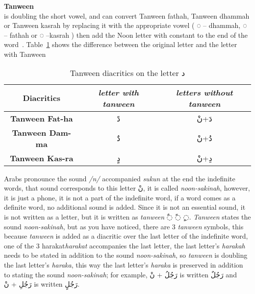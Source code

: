 \begin{definition}\label{def:tanween_definition}
  \textbf{Tanween} \hfill \\
  is doubling the short vowel, and can convert
Tanween fathah, Tanween dhammah or Tanween kasrah by
replacing it with the appropriate vowel ( ُ◌ – dhammah, َ◌ –
fathah or ِ◌ –kasrah ) then add the Noon letter with constant to the end of the word~\cite{Alnagdawi2013}. Table~\ref{tables:Tanween_dal}
shows the difference between the original letter and the letter with Tanween

\begin{table}[H]
	\centering
	\begin{tabular}{c c c}
		\toprule
		\textbf{\small{Diacritics}} & \small{\textit{letter with tanween }} & \small{\textit{letters without tanween}} \\
		\midrule

          \textbf{\small{Tanween Fat-ha}}  & \textarabic{دً} &  \textarabic{دَ+نْ}\\
          \textbf{\small{Tanween Dam-ma}}  & \textarabic{دٌ} &  \textarabic{دُ+نْ}\\
          \textbf{\small{Tanween Kas-ra}}  & \textarabic{دٍ} &  \textarabic{دِ+نْ}\\


		\bottomrule
	\end{tabular}
	\caption{Tanween diacritics on the letter  \textarabic{ د }} \label{tables:Tanween_dal}
\end{table}


\end{definition}

 Arabs pronounce the sound \textit{/n/} accompanied \textit{sukun} at the end the indefinite words, that sound corresponds to this
letter \textarabic{نْ}, it is called \textit{noon-sakinah}, however, it is
just a phone, it is not a part of the indefinite word, if a word comes as a
definite word, no additional sound is added. Since it is not an essential sound,
it is not written as a letter, but it is written as  \textit{tanween}
\textarabic{◌ٌ ◌ً ◌ٍ}.
\textit{Tanween} states the sound \textit{noon-sakinah}, but as you have noticed,
there are 3 \textit{tanween} symbols, this because  \textit{tanween} is added as
a diacritic over the last letter of the indefinite word, one of the 3 harakat\textit{harakat} accompanies the last letter, the last letter's \textit{harakah}
needs to be stated in addition to the sound \textit{noon-sakinah}, so
\textit{tanween} is doubling the last letter's \textit{haraka}, this way the last
letter's \textit{haraka} is preserved in addition to stating the sound
\textit{noon-sakinah}; for example, \textarabic{رَجُلُ + نْ} is written
\textarabic{رَجُلٌ} and  \textarabic{رَجُلِ + نْ} is written \textarabic{رَجُلٍ}.


